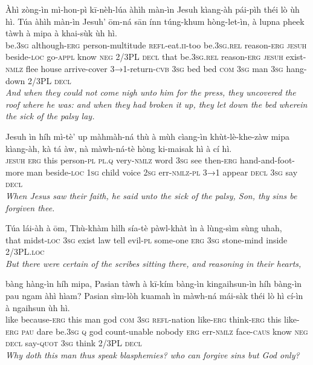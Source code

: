 \documentclass[11pt,a4paper]{article}
\begin{document}
\begin{exe}
\gll Àhì zòng-ìn mì-hon-pì kī-nèh-lúa àhìh màn-ìn Jesuh kìang-àh pái-pìh théi lò ùh hì. Túa àhìh màn-ìn Jesuh' ōm-ná sān ínn túng-khum hòng-let-ìn, à lupna pheek tàwh à mipa à khai-sùk ùh hì. \\
     be.\textsc{3sg} although-\textsc{erg} person-multitude \textsc{refl}-eat.\textsc{ii}-too be.\textsc{3sg}.\textsc{rel} reason-\textsc{erg} \textsc{jesuh} beside-\textsc{loc} go-\textsc{appl} know \textsc{neg} 2/3PL \textsc{decl} that be.\textsc{3sg}.\textsc{rel} reason-\textsc{erg} \textsc{jesuh} exist-\textsc{nmlz} flee house arrive-cover \textsc{3→1}-return-\textsc{cvb} \textsc{3sg} bed bed \textsc{com} \textsc{3sg} man \textsc{3sg} hang-down 2/3PL \textsc{decl} \\
\glt \textcolor{kjvcolor}{\textit{And when they could not come nigh unto him for the press, they uncovered the roof where he was: and when they had broken it up, they let down the bed wherein the sick of the palsy lay.}}

\gll Jesuh ìn híh mì-tè' up màhmàh-ná thù à mùh cìang-ìn khùt-lè-khe-zàw mipa kìang-àh, kà tá àw, nà màwh-ná-tè hòng ki-maisak hì à cí hì. \\
     \textsc{jesuh} \textsc{erg} this person-\textsc{pl} \textsc{pl}.\textsc{q} very-\textsc{nmlz} word \textsc{3sg} see then-\textsc{erg} hand-and-foot-more man beside-\textsc{loc} \textsc{1sg} child voice \textsc{2sg} err-\textsc{nmlz}-\textsc{pl} \textsc{3→1} appear \textsc{decl} \textsc{3sg} say \textsc{decl} \\
\glt \textcolor{kjvcolor}{\textit{When Jesus saw their faith, he said unto the sick of the palsy, Son, thy sins be forgiven thee.}}

\gll Túa lái-àh à ōm, Thù-khàm hìlh sía-tè pàwl-khàt ìn à lùng-sìm sùng uhah, \\
     that midst-\textsc{loc} \textsc{3sg} exist law tell evil-\textsc{pl} some-one \textsc{erg} \textsc{3sg} stone-mind inside 2/3PL.\textsc{loc} \\
\glt \textcolor{kjvcolor}{\textit{But there were certain of the scribes sitting there, and reasoning in their hearts,}}

\gll bàng hàng-ìn híh mipa, Pasian tàwh à kī-kím bàng-ìn kingaihsun-ìn híh bàng-ìn pau ngam àhì hìam? Pasian sìm-lòh kuamah ìn màwh-ná mái-sàk théi lò hì cí-ìn à ngaihsun ùh hì. \\
     like because-\textsc{erg} this man god \textsc{com} \textsc{3sg} \textsc{refl}-nation like-\textsc{erg} think-\textsc{erg} this like-\textsc{erg} \textsc{pau} dare be.\textsc{3sg} \textsc{q} god count-unable nobody \textsc{erg} err-\textsc{nmlz} face-\textsc{caus} know \textsc{neg} \textsc{decl} say-\textsc{quot} \textsc{3sg} think 2/3PL \textsc{decl} \\
\glt \textcolor{kjvcolor}{\textit{Why doth this man thus speak blasphemies? who can forgive sins but God only?}}


\end{exe}
\end{document}
